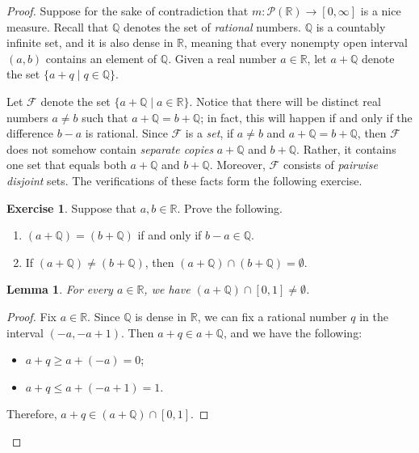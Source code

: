 \documentclass[a4paper]{memoir}
\newtheorem{lemma}[theorem]{Lemma}
\theoremstyle{definition}
\newtheorem{exercise}[theorem]{Exercise}
\newcommand{\bb}{\mathbb}
\newcommand{\power}{\ensuremath{\mathscr{P}}}
\begin{document}
\begin{proof}
  Suppose for the sake of contradiction that $m: \power(\mathbb{R}) \rightarrow [0,\infty]$ 
  is a nice measure. Recall that $\bb{Q}$ denotes the set of \emph{rational} numbers. 
  $\bb{Q}$ is a countably infinite set, and it is also dense in $\mathbb{R}$, meaning that 
  every nonempty open interval $(a,b)$ contains an element of $\mathbb{Q}$. Given 
  a real number $a \in \bb{R}$, let $a + \bb{Q}$ denote the set 
  $\{a + q \mid q \in \bb{Q}\}$.
  
  Let $\mathcal{F}$ denote the set $\{a + \bb{Q} \mid a \in \bb{R}\}$. Notice that there will 
  be distinct real numbers $a \neq b$ such that $a + \bb{Q} = b + \bb{Q}$; in fact, this 
  will happen if and only if the difference $b - a$ is rational. Since $\mathcal{F}$ 
  is a \emph{set}, if $a \neq b$ and $a + \bb{Q} = b + \bb{Q}$, then $\mathcal{F}$ does not 
  somehow contain \emph{separate copies} $a + \bb{Q}$ and $b + \bb{Q}$. Rather, it contains 
  one set that equals both $a + \bb{Q}$ and $b + \bb{Q}$. Moreover, $\mathcal{F}$ consists of 
  \emph{pairwise disjoint} sets. The verifications of these facts form the following exercise.
  
  \begin{exercise} \label{exercise: vitali}
    Suppose that $a,b \in \bb{R}$. Prove the following.
    \begin{enumerate}
      \item $(a + \bb{Q}) = (b + \bb{Q})$ if and only if $b-a \in \bb{Q}$.
      \item If $(a + \bb{Q}) \neq (b + \bb{Q})$, then $(a + \bb{Q}) \cap (b + \bb{Q}) = \emptyset$.
    \end{enumerate}
  \end{exercise}
  
  \begin{lemma}
    For every $a \in \bb{R}$, we have $(a + \bb{Q}) \cap [0,1] \neq \emptyset$.
  \end{lemma}
  
  \begin{proof}
    Fix $a \in \bb{R}$. Since $\bb{Q}$ is dense in $\bb{R}$, we can fix a rational number 
    $q$ in the interval $(-a, -a + 1)$. Then $a + q \in a + \bb{Q}$, and we have the following:
    \begin{itemize}
      \item $a + q \geq a + (-a) = 0$;
      \item $a + q \leq a + (-a + 1) = 1$.
    \end{itemize}
    Therefore, $a + q \in (a + \bb{Q}) \cap [0,1]$.
  \end{proof}
  

\end{proof}
\end{document}

